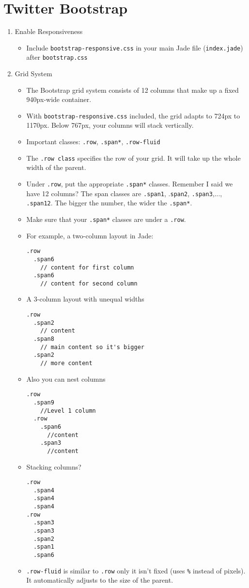 \documentclass[10pt, twocolumn]{article}
\begin{document}
\section{Twitter Bootstrap}
\begin{enumerate}
\item Enable Responsiveness
\begin{itemize}
\item Include \texttt{bootstrap-responsive.css} in your main Jade file (\texttt{index.jade}) after \texttt{bootstrap.css}
\end{itemize}  

\item Grid System
\begin{itemize}
\item The Bootstrap grid system consists of 12 columns that make up a fixed 940px-wide container.
\item With \texttt{bootstrap-responsive.css} included, the grid adapts to 724px to 1170px.  Below 767px, your columns will stack vertically.
\item Important classes: \texttt{.row}, \texttt{.span*}, \texttt{.row-fluid}
\item The \texttt{.row class} specifies the row of your grid.  It will take up the whole width of the parent.
\item Under \texttt{.row}, put the appropriate \texttt{.span*} classes.  Remember I said we have 12 columns?  The span classes are \texttt{.span1}, .\texttt{span2}, \texttt{.span3},..., \texttt{.span12}.  The bigger the number, the wider the \texttt{.span*}.
\item Make sure that your \texttt{.span*} classes are under a \texttt{.row}.
\item For example, a two-column layout in Jade:
\begin{lstlisting}[frame=single]
.row
  .span6
    // content for first column
  .span6
    // content for second column
\end{lstlisting}
\item A 3-column layout with unequal widths
\begin{lstlisting}[frame=single]
.row
  .span2
    // content
  .span8
    // main content so it's bigger
  .span2
    // more content
\end{lstlisting}
\item Also you can nest columns
\begin{lstlisting}[frame=single]
.row
  .span9
    //Level 1 column
  .row
    .span6
      //content
    .span3
      //content
\end{lstlisting}
\item Stacking columns?
\begin{lstlisting}[frame=single]
.row
  .span4
  .span4
  .span4
.row
  .span3
  .span3
  .span2
  .span1
  .span6 
\end{lstlisting}
\item \texttt{.row-fluid} is similar to \texttt{.row} only it isn't fixed (uses \texttt{\%} instead of pixels).  It automatically adjusts to the size of the parent.
\end{itemize}


\end{enumerate}
\end{document}
